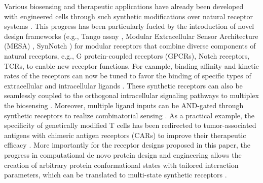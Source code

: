 \documentclass[twocolumn]{IEEEtran}
\begin{document}

Various biosensing and therapeutic applications have already been developed with engineered cells through such synthetic modifications over natural receptor systems \cite{chang2020synthetic, hicks2020synthetic}. This progress has been particularly fueled by the introduction of novel design frameworks (e.g., Tango assay \cite{barnea2008genetic}, Modular Extracellular Sensor Architecture (MESA) \cite{daringer2014modular}, SynNotch \cite{morsut2016engineering}) for modular receptors that combine diverse components of natural receptors, e.g., G protein-coupled receptors (GPCRs), Notch receptors, TCRs, to enable new receptor functions. For example, binding affinity and kinetic rates of the receptors can now be tuned to favor the binding of specific types of extracellular and intracellular ligands \cite{chervin2008engineering, bowerman2009engineering}. These synthetic receptors can also be seamlessly coupled to the orthogonal intracellular signaling pathways to multiplex the biosensing \cite{chen2021programmable}. Moreover, multiple ligand inputs can be AND-gated through synthetic receptors to realize combinatorial sensing \cite{roybal2016precision}. As a practical example, the specificity of genetically modified T cells has been redirected to tumor-associated antigens with chimeric antigen receptors (CARs) to improve their therapeutic efficacy \cite{jena2010redirecting}. More importantly for the receptor designs proposed in this paper, the progress in computational de novo protein design and engineering allows the creation of arbitrary protein conformational states with tailored interaction parameters, which can be translated to multi-state synthetic receptors \cite{huang2016coming, pan2021recent, quijano2021novo, wei2020computational, dagliyan2013rational}.

\end{document}
